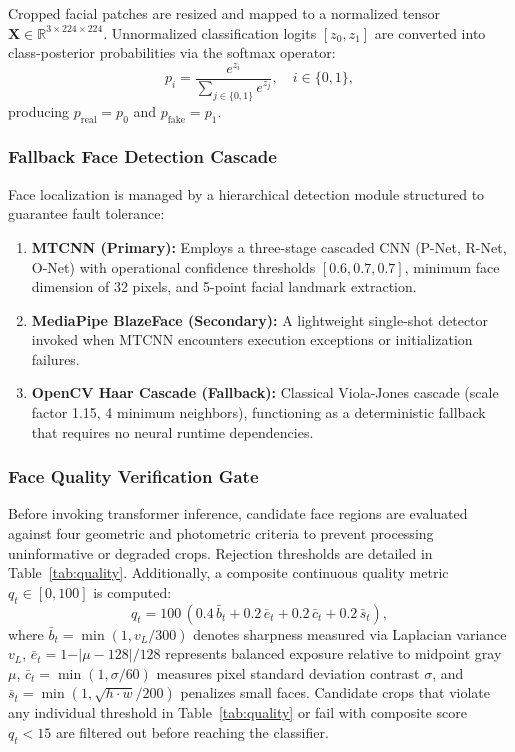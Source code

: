 \documentclass[conference]{IEEEtran}
\begin{document}
Cropped facial patches are resized and mapped to a normalized tensor $\mathbf{X} \in \mathbb{R}^{3 \times 224 \times 224}$. Unnormalized classification logits $[z_0, z_1]$ are converted into class-posterior probabilities via the softmax operator:
\begin{equation}
p_i = \frac{e^{z_i}}{\sum_{j \in \{0, 1\}} e^{z_j}}, \quad i \in \{0, 1\},
\label{eq:softmax}
\end{equation}
producing $p_{\text{real}} = p_0$ and $p_{\text{fake}} = p_1$.

\subsubsection{Fallback Face Detection Cascade}
Face localization is managed by a hierarchical detection module structured to guarantee fault tolerance:
\begin{enumerate}
\item \textbf{MTCNN (Primary):} Employs a three-stage cascaded CNN (P-Net, R-Net, O-Net) \cite{zhang2016} with operational confidence thresholds $[0.6, 0.7, 0.7]$, minimum face dimension of 32 pixels, and 5-point facial landmark extraction.
\item \textbf{MediaPipe BlazeFace (Secondary):} A lightweight single-shot detector \cite{bazarevsky2019} invoked when MTCNN encounters execution exceptions or initialization failures.
\item \textbf{OpenCV Haar Cascade (Fallback):} Classical Viola-Jones cascade \cite{viola2001} (scale factor 1.15, 4 minimum neighbors), functioning as a deterministic fallback that requires no neural runtime dependencies.
\end{enumerate}

\subsubsection{Face Quality Verification Gate}
Before invoking transformer inference, candidate face regions are evaluated against four geometric and photometric criteria to prevent processing uninformative or degraded crops. Rejection thresholds are detailed in Table~\ref{tab:quality}. Additionally, a composite continuous quality metric $q_t \in [0, 100]$ is computed:
\begin{equation}
q_t = 100\,(0.4\,\bar{b}_t + 0.2\,\bar{e}_t + 0.2\,\bar{c}_t + 0.2\,\bar{s}_t),
\label{eq:quality}
\end{equation}
where $\bar{b}_t = \min(1, v_L / 300)$ denotes sharpness measured via Laplacian variance $v_L$, $\bar{e}_t = 1 - \vert{}\mu - 128\vert{} / 128$ represents balanced exposure relative to midpoint gray $\mu$, $\bar{c}_t = \min(1, \sigma / 60)$ measures pixel standard deviation contrast $\sigma$, and $\bar{s}_t = \min(1, \sqrt{h \cdot w} / 200)$ penalizes small faces. Candidate crops that violate any individual threshold in Table~\ref{tab:quality} or fail with composite score $q_t < 15$ are filtered out before reaching the classifier.
\end{document}
